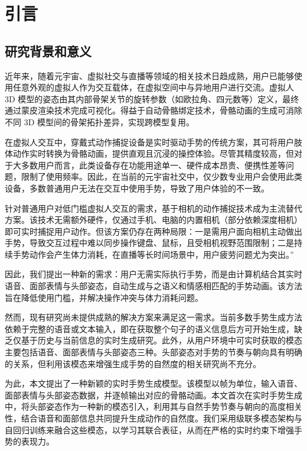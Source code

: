 
\chapter{引言}

\section{研究背景和意义}

近年来，随着元宇宙、虚拟社交与直播等领域的相关技术日趋成熟，用户已能够使用任意外观的虚拟人作为交互载体，在虚拟空间中与异地用户进行交流。虚拟人 3D 模型的姿态由其内部骨架关节的旋转参数（如欧拉角、四元数等）定义，最终通过蒙皮渲染技术完成可视化。得益于自动骨骼绑定技术，骨骼动画的生成可消除不同 3D 模型间的骨架拓扑差异，实现跨模型复用。

在虚拟人交互中，穿戴式动作捕捉设备是实时驱动手势的传统方案，其可将用户肢体动作实时转换为骨骼动画，提供直观且沉浸的操控体验。尽管其精度较高，但对于大多数用户而言，此类设备存在功能用途单一、硬件成本昂贵、便携性差等问题，限制了使用频率。因此，在当前的元宇宙社交中，仅少数专业用户会使用此类设备，多数普通用户无法在交互中使用手势，导致了用户体验的不一致。

针对普通用户对低门槛虚拟人交互的需求，基于相机的动作捕捉技术\cite{mediapipefacemesh,AppleARKitTrackingGuide}成为主流替代方案。该技术无需额外硬件，仅通过手机、电脑的内置相机（部分依赖深度相机）即可实时捕捉用户动作。但该方案仍存在两种局限：一是需用户面向相机主动做出手势，导致交互过程中难以同步操作键盘、鼠标，且受相机视野范围限制；二是持续手势动作会产生体力消耗，在直播等长时间场景中，用户疲劳问题尤为突出。”

因此，我们提出一种新的需求：用户无需实际执行手势，而是由计算机结合其实时语音、面部表情与头部姿态，自动生成与之语义和情感相匹配的手势动画。该方法旨在降低使用门槛，并解决操作冲突与体力消耗问题。

然而，现有研究尚未提供成熟的解决方案来满足这一需求。当前多数手势生成方法依赖于完整的语音或文本输入，即在获取整个句子的语义信息后方可开始生成，缺乏仅基于历史与当前信息的实时生成研究。此外，从用户环境中可实时获取的模态主要包括语音、面部表情与头部姿态三种。头部姿态对手势的节奏与朝向具有明确的关系，但利用该模态来增强生成手势的自然度的相关研究尚不充分。

为此，本文提出了一种新颖的实时手势生成模型。该模型以帧为单位，输入语音、面部表情与头部姿态数据，并逐帧输出对应的骨骼动画。本文首次在实时手势生成中，将头部姿态作为一种新的模态引入，利用其与自然手势节奏与朝向的高度相关性，结合语音和面部信息共同提升生成动作的自然度。我们采用级联多模态架构与自回归训练来融合这些模态，以学习其联合表征，从而在严格的实时约束下增强手势的表现力。


